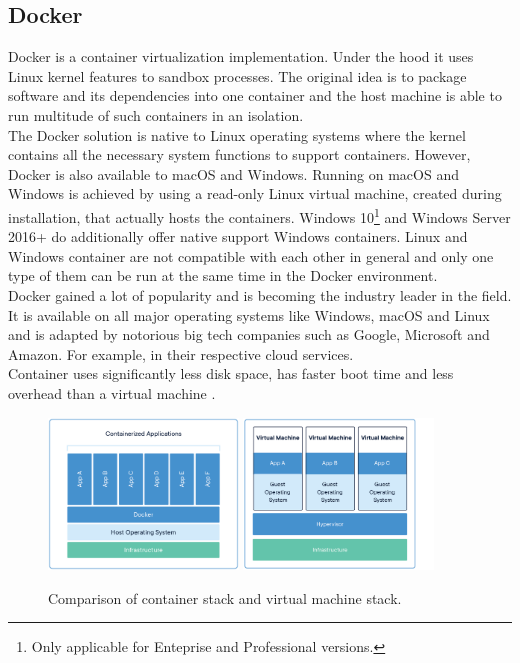 \documentclass[thesis=M,english]{FITthesis}[2019/03/06]
\begin{document}
\subsection{Docker}
Docker is a container virtualization implementation. Under the hood it uses Linux kernel features to sandbox processes. The original idea is to package software and its dependencies into one container and the host machine is able to run multitude of such containers in an isolation.\\

The Docker solution is native to Linux operating systems where the kernel contains all the necessary system functions to support containers. However, Docker is also available to macOS and Windows. Running on macOS and Windows is achieved by using a read-only Linux virtual machine, created during installation, that actually hosts the containers. Windows 10\footnote{Only applicable for Enteprise and Professional versions.} and Windows Server 2016+ do additionally offer native support Windows containers. Linux and Windows container are not compatible with each other in general and only one type of them can be run at the same time in the Docker environment. \\

Docker gained a lot of popularity and is becoming the industry leader in the field. It is available on all major operating systems  like Windows, macOS and Linux and is adapted by notorious big tech companies such as Google, Microsoft and Amazon. For example, in their respective cloud services. \\

Container uses significantly less disk space, has faster boot time and less overhead than a virtual machine \cite{docker-performance}.


\begin{figure}[ht!]
	\centering
	\includegraphics[width=0.45\textwidth]{imgs/docker-stack.png}
	\includegraphics[width=0.45\textwidth]{imgs/vm-stack.png}
	\caption{Comparison of container stack and virtual machine stack.}
	\label{label:containervsvm}
\end{figure}
\end{document}
